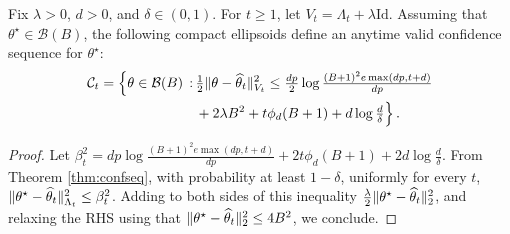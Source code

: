 \begin{corollary}\label{cor:conf}
	Fix $\lambda>0$, $d>0$, and $\delta\in(0,1)$. For $t\geq 1$, let $V_t = \Lambda_t + \lambda\mathrm{Id}$. Assuming that $\theta^\star\in\mathcal B(B)$, the following compact ellipsoids define an anytime valid confidence sequence for $\theta^\star$:
	\begin{align*}\mathcal{\mathcal{C}}_t = \Big\{\theta\in\mathcal B(B)\,:\,&    \tfrac{1}{2}\|\theta-\widehat\theta_t\|_{V_t}^2\leq \tfrac{dp}{2}\log\tfrac{(B+1)^2e\max(dp,t+d)}{dp} \\&+ 2\lambda B^2 + t\phi_d (B+1) + d\log\tfrac{d}{\delta}\Big\}\,.\end{align*}
\end{corollary}
\begin{proof}
	Let $\beta_t^2 = dp\log\tfrac{(B+1)^2e\max(dp,t+d)}{dp} + 2t\phi_d (B+1) + 2d\log\tfrac{d}{\delta}$. From Theorem \ref{thm:confseq}, with probability at least $1-\delta$, uniformly for every $t$, $\|\theta^\star-\widehat\theta_t\|_{\Lambda_t}^2\leq\beta_t^2$. Adding to both sides of this inequality $\frac{\lambda}{2}\|\theta^\star-\widehat\theta_t\|_2^2$, and relaxing the RHS using that $\|\theta^\star-\widehat\theta_t\|_2^2\leq 4 B^2$, we conclude.
\end{proof}










